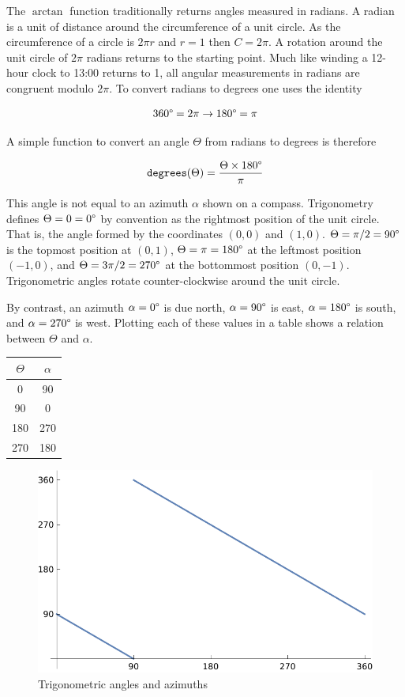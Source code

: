 \documentclass{book}
\begin{document}
The $\arctan$ function traditionally returns angles measured in radians. A radian is a unit of distance around the circumference of a unit circle. As the circumference of a circle is $2 \pi r$ and $r=1$ then $C=2\pi$. A rotation around the unit circle of $2\pi$ radians returns to the starting point. Much like winding a 12-hour clock to 13:00 returns to 1, all angular measurements in radians are congruent modulo $2\pi$. To convert radians to degrees one uses the identity

\begin{equation}
360\degree = 2\pi \to 180\degree = \pi
\end{equation}

A simple function to convert an angle $\Theta$ from radians to degrees is therefore

\begin{equation}
\texttt{degrees}(\Theta) = \frac{\Theta \times 180\degree}{\pi}
\end{equation}

This angle is not equal to an azimuth $\alpha$ shown on a compass. Trigonometry defines $\Theta=0=0\degree$ by convention as the rightmost position of the unit circle. That is, the angle formed by the coordinates $(0,0)$ and $(1,0)$. $\Theta = \pi/2 = 90\degree$ is the topmost position at $(0,1)$, $\Theta = \pi = 180\degree$ at the leftmost position $(-1,0)$, and $\Theta = {3\pi}/2 = 270\degree$ at the bottommost position $(0,-1)$. Trigonometric angles rotate counter-clockwise around the unit circle.

By contrast, an azimuth $\alpha = 0\degree$ is due north, $\alpha = 90\degree$ is east, $\alpha = 180\degree$ is south, and $\alpha = 270\degree$ is west. Plotting each of these values in a table shows a relation between $\Theta$ and $\alpha$.

\begin{center}
\begin{tabular}{c | c}
$\Theta$ & $\alpha$ \\
\hline
0 & 90 \\
90 & 0 \\
180 & 270 \\
270 & 180 \\
\end{tabular}
\end{center}

\begin{figure}[H]
\centering
\includegraphics[width=.75\textwidth,keepaspectratio]{figures/azimuth}
\caption{Trigonometric angles and azimuths}
\end{figure}
\end{document}
